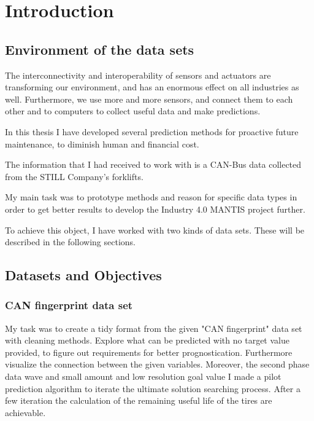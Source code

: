 \chapter*{Introduction}
\setcounter{chapter}{1}
\section{Environment of the data sets}
The interconnectivity and interoperability of sensors and actuators are transforming our environment, and has an enormous effect on all industries as well. \cite{GartnerIoT} Furthermore, we use more and more sensors, and connect them to each other and to computers to collect useful data and make predictions.

In this thesis I have developed several prediction methods for proactive future maintenance, to diminish human and financial cost.

The information that I had received to work with is a CAN-Bus data collected from the STILL Company's forklifts.

My main task was to prototype methods and reason for specific data types in order to get better results to develop the Industry 4.0 MANTIS project further.

To achieve this object, I have worked with two kinds of data sets. These will be described in the following sections.
\section{Datasets and Objectives}
    \subsection{CAN fingerprint data set}
\noindent
My task was to create a tidy format from the given "CAN fingerprint" data set with cleaning methods. Explore what can be predicted with no target value provided, to figure out requirements for better prognostication. Furthermore visualize the connection between the given variables. Moreover, the second phase data wave and small amount and low resolution goal value I made a pilot prediction algorithm to iterate the ultimate solution searching process. 
\noindent
After a few iteration the calculation of the remaining useful life of the tires are achievable. 
